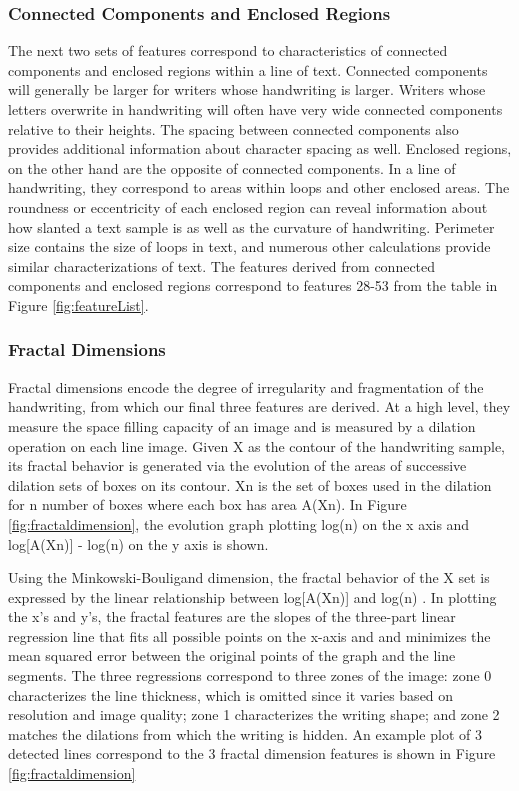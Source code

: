 \documentclass[paper=a4, fontsize=11pt]{scrartcl} %
\numberwithin{equation}{section} %
\numberwithin{figure}{section} %
\numberwithin{table}{section} %
\begin{document}
\subsubsection{Connected Components and Enclosed Regions}
The next two sets of features correspond to characteristics of
connected components and enclosed regions within a line of
text. Connected components will generally be larger for writers whose
handwriting is larger. Writers whose letters overwrite in handwriting
will often have very wide connected components relative to their
heights. The spacing between connected components also provides
additional information about character spacing as well. Enclosed
regions, on the other hand are the opposite of connected
components. In a line of handwriting, they correspond to areas within
loops and other enclosed areas. The roundness or eccentricity of each
enclosed region can reveal information about how slanted a text sample
is as well as the curvature of handwriting. Perimeter size contains
the size of loops in text, and numerous other calculations provide
similar characterizations of text. The features derived from connected
components and enclosed regions correspond to features 28-53 from the
table in Figure \ref{fig:featureList}.

\subsubsection{Fractal Dimensions}
Fractal dimensions encode the degree of irregularity and fragmentation
of the handwriting, from which our final three features are
derived\cite{FractalDimensions}. At a high level, they measure the space filling capacity of an image and is measured by a dilation operation on each line image. Given X as the
contour of the handwriting sample, its fractal behavior is generated
via the evolution of the areas of successive dilation sets of boxes on
its contour. Xn is the set of boxes used in the dilation for n number of boxes where each box has area A(Xn). In Figure \ref{fig:fractaldimension}, the evolution graph plotting log(n) on the x axis and log[A(Xn)] - log(n) on the y axis is shown.

Using the Minkowski-Bouligand dimension, the fractal behavior of the X
set is expressed by the linear relationship between log[A(Xn)] and
log(n) \cite{SyntheticParameters}. In plotting the x's and y's, the
fractal features are the slopes of the three-part linear regression
line that fits all possible points on the x-axis and and minimizes the
mean squared error between the original points of the graph and the
line segments\cite{GeometricalFeatures}.  The three regressions
correspond to three zones of the image: zone 0 characterizes the line
thickness, which is omitted since it varies based on resolution and
image quality; zone 1 characterizes the writing shape; and zone 2
matches the dilations from which the writing is hidden. An example
plot of 3 detected lines correspond to the 3 fractal dimension
features is shown in Figure \ref{fig:fractaldimension}
\end{document}
